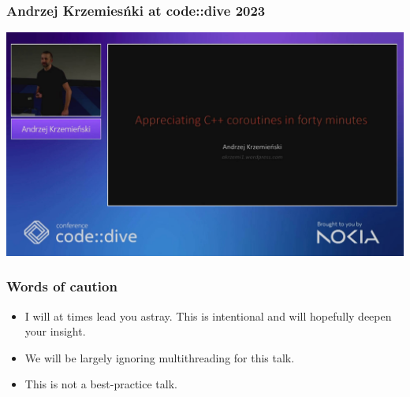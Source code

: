 \documentclass[aspectratio=169]{beamer}
\begin{document}
\begin{frame}
  \frametitle{Andrzej Krzemiesńki at code::dive 2023}

  \begin{center}
    \href{https://www.youtube.com/watch?v=ZSkign_3Hp4}{\includegraphics[height=.95\textheight]{corogfx2/talk_andrzej.jpg}}
  \end{center}

\end{frame}

\begin{frame}
  \frametitle{Words of caution}

  \begin{itemize}
  \item I will at times lead you astray. This is intentional and will hopefully deepen your insight.
  \vspace{20pt}
  \item We will be largely ignoring multithreading for this talk.
  \vspace{20pt}
  \item This is not a best-practice talk.
  \end{itemize}
\end{frame}
\end{document}
